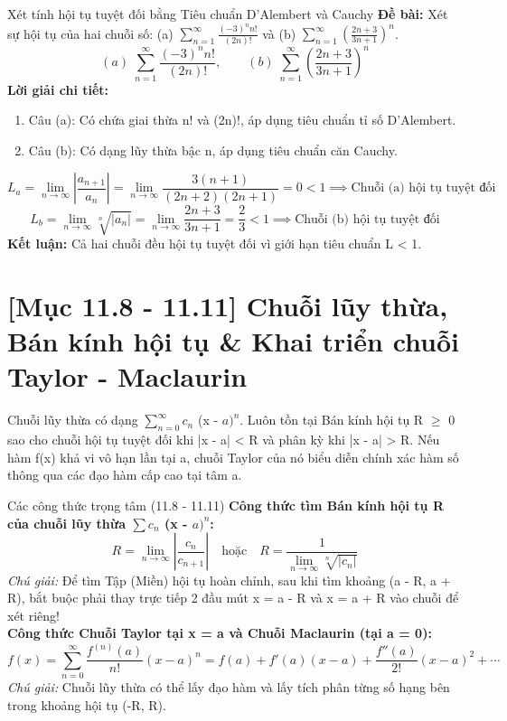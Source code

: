 \documentclass[11pt,a4paper,oneside]{book}
\begin{document}
\begin{vidu}{Xét tính hội tụ tuyệt đối bằng Tiêu chuẩn D'Alembert và Cauchy}
\textbf{Đề bài:} Xét sự hội tụ của hai chuỗi số: (a) $\sum_{n=1}^\infty \frac{(-3)^n n!}{(2n)!}$ và (b) $\sum_{n=1}^\infty \left(\frac{2n + 3}{3n + 1}\right)^n$.
\[ (a)\; \sum_{n=1}^\infty \frac{(-3)^n n!}{(2n)!}, \qquad (b)\; \sum_{n=1}^\infty \left(\frac{2n + 3}{3n + 1}\right)^n \]
\textbf{Lời giải chi tiết:}
\begin{enumerate}[leftmargin=1.5em, itemsep=2pt]
  \item Câu (a): Có chứa giai thừa n! và (2n)!, áp dụng tiêu chuẩn tỉ số D'Alembert.
  \item Câu (b): Có dạng lũy thừa bậc n, áp dụng tiêu chuẩn căn Cauchy.
\end{enumerate}
\[ L_a = \lim_{n \to \infty} \left|\frac{a_{n+1}}{a_n}\right| = \lim_{n \to \infty} \frac{3(n+1)}{(2n+2)(2n+1)} = 0 < 1 \implies \text{Chuỗi (a) hội tụ tuyệt đối} \]
\[ L_b = \lim_{n \to \infty} \sqrt[n]{|a_n|} = \lim_{n \to \infty} \frac{2n + 3}{3n + 1} = \frac{2}{3} < 1 \implies \text{Chuỗi (b) hội tụ tuyệt đối} \]
\noindent\textbf{Kết luận:} Cả hai chuỗi đều hội tụ tuyệt đối vì giới hạn tiêu chuẩn L < 1.
\end{vidu}

\section{[Mục 11.8 - 11.11] Chuỗi lũy thừa, Bán kính hội tụ \& Khai triển chuỗi Taylor - Maclaurin}
Chuỗi lũy thừa có dạng $\sum_{n=0}^\infty c_n$ (x - $a)^n$. Luôn tồn tại Bán kính hội tụ R $\ge$  0 sao cho chuỗi hội tụ tuyệt đối khi |x - a| < R và phân kỳ khi |x - a| > R. Nếu hàm f(x) khả vi vô hạn lần tại a, chuỗi Taylor của nó biểu diễn chính xác hàm số thông qua các đạo hàm cấp cao tại tâm a.

\begin{congthuc}{Các công thức trọng tâm (11.8 - 11.11)}
\noindent\textbf{Công thức tìm Bán kính hội tụ R của chuỗi lũy thừa $\sum c_n$ (x - $a)^n$:}
\[ R = \lim_{n \to \infty} \left|\frac{c_n}{c_{n+1}}\right| \quad \text{hoặc} \quad R = \frac{1}{\lim_{n \to \infty} \sqrt[n]{|c_n|}} \]
\noindent\textit{Chú giải:} Để tìm Tập (Miền) hội tụ hoàn chỉnh, sau khi tìm khoảng (a - R, a + R), bắt buộc phải thay trực tiếp 2 đầu mút x = a - R và x = a + R vào chuỗi để xét riêng!\\[4pt]
\noindent\textbf{Công thức Chuỗi Taylor tại x = a và Chuỗi Maclaurin (tại a = 0):}
\[ f(x) = \sum_{n=0}^\infty \frac{f^{(n)}(a)}{n!}(x - a)^n = f(a) + f'(a)(x - a) + \frac{f''(a)}{2!}(x - a)^2 + \cdots \]
\noindent\textit{Chú giải:} Chuỗi lũy thừa có thể lấy đạo hàm và lấy tích phân từng số hạng bên trong khoảng hội tụ (-R, R).\\[4pt]
\end{congthuc}
\end{document}
